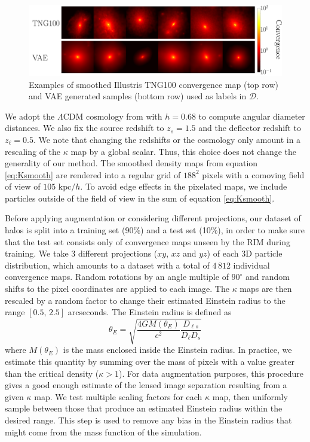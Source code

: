 \begin{figure}[t!]
        \centering
        \includegraphics[width=0.8\linewidth]{figures/kap_vae_sample}
        \caption{Examples of smoothed Illustris TNG100 convergence map (top row) 
        and VAE generated samples (bottom row) used as labels in $\mathcal{D}$.}
        \label{fig:kappa}
\end{figure}

We adopt the $\Lambda$CDM cosmology from 
\citet{PlanckCollaboration2018} with $h=0.68$ to compute 
angular diameter distances. We also fix the 
source redshift to $z_s=1.5$ and the deflector redshift to $z_\ell=0.5$. 
We note that changing the redshifts or the cosmology 
only amount in a rescaling of the $\kappa$ map by a global scalar. Thus, this choice does not change the generality of our method.
The smoothed density maps from equation \eqref{eq:Ksmooth} are 
rendered into a regular grid of $188^2$ pixels with a comoving field of view of $105\,\,\mathrm{kpc}/h$. 
To avoid edge effects in the pixelated maps, 
we include particles outside of the field of view in the sum of equation \eqref{eq:Ksmooth}.
\par
Before applying augmentation or considering different projections, our dataset of halos is split into a 
training set (90\%) and a test set (10\%), in order to make sure that the test set consists only 
of convergence maps unseen by the RIM during training.
We take 3 different projections ($xy$, $xz$ and $yz$) of each 3D particle 
distribution, which amounts to a dataset with a total of $4\,812$ individual convergence maps. 
Random rotations by an angle multiple of $90^{\circ}$ and random shifts to the pixel coordinates 
are applied to each image. The $\kappa$ maps are then rescaled by a random factor to change their 
estimated Einstein radius to the range 
$[0.5,\,2.5]$ arcseconds.
The Einstein radius is defined as
\begin{equation}\label{eq:ThetaE}
        \theta_E = \sqrt{\frac{4GM(\theta_E)}{c^ 2} \frac{D_{\ell s}}{D_\ell D_s}}
\end{equation} 
where $M(\theta_E)$ is the mass enclosed inside the Einstein radius. In practice, we estimate this quantity 
by summing over the mass of pixels with a value greater than the critical density ($\kappa > 1$). 
For data augmentation purposes, this procedure gives a good enough estimate of the lensed image separation resulting from a given $\kappa$ map. 
We test multiple scaling factors for each $\kappa$ map, then uniformly sample between those that produce an estimated 
Einstein radius within the 
desired range. This step is used to remove any bias in the Einstein radius that might come from the mass function 
of the simulation.

